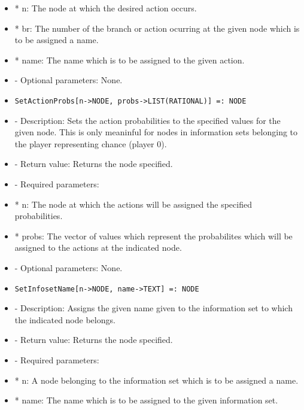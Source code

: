 \begin{itemize}
\bd
\item
*  n:  The node at which the desired action occurs.
\item
*  br:  The number of the branch or action ocurring at the given node
which is to be assigned a name.
\item
*  name:  The name which is to be assigned to the given action.
\ed

\item
- Optional parameters:  None.

\ed

\item

\begin{verbatim}
SetActionProbs[n->NODE, probs->LIST(RATIONAL)] =: NODE
\end{verbatim}

\bd
\item
- Description:  Sets the action probabilities to the specified values 
for the given node.  This is only meaninful for nodes in information
sets belonging to the player representing chance (player 0).
\item
- Return value:  Returns the node specified.
\item
- Required parameters:
	
\bd
\item
*  n:  The node at which the actions will be assigned the specified
probabilities.
\item
*  probs:  The vector of values which represent the probabilites 
which will be assigned to the actions at the indicated node.
\ed

\item
- Optional parameters:  None.
\ed

\item

\begin{verbatim}
SetInfosetName[n->NODE, name->TEXT] =: NODE
\end{verbatim}

\bd
\item
- Description:  Assigns the given name given to the information set to 
which the indicated node belongs.
\item
- Return value:  Returns the node specified.
\item
- Required parameters:
	
\bd
\item
*  n:  A node belonging to the information set which is to be 
assigned a name.
\item
*  name:  The name which is to be assigned to the given information set.
\ed


\end{itemize}
